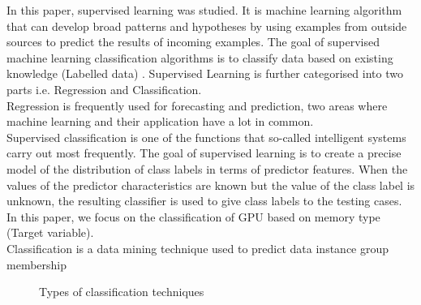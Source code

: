 \documentclass[conference]{IEEEtran}
\begin{document}
	In this paper, supervised learning was studied. It is machine learning algorithm that can develop broad patterns and hypotheses by using examples from outside sources to predict the results of incoming examples. The goal of supervised machine learning classification algorithms is to classify data based on existing knowledge (Labelled data) \cite{C3}. Supervised Learning is further categorised into two parts i.e. Regression and Classification.\\
	Regression is frequently used for forecasting and prediction, two areas where machine learning and their application have a lot in common. \\
	
	Supervised classification is one of the functions that so-called intelligent systems carry out most frequently\cite{C7}. The goal of supervised learning is to create a precise model of the distribution of class labels in terms of predictor features. When the values of the predictor characteristics are known but the value of the class label is unknown, the resulting classifier is used to give class labels to the testing cases. In this paper, we focus on the classification of GPU based on memory type (Target variable).\\
	Classification is a data mining technique used to predict data instance group membership\cite{C9}\\
	\begin{figure}[H]
		\caption{Types of classification techniques}
		\label{Classification Tree Diagram}
	\end{figure}
\end{document}
